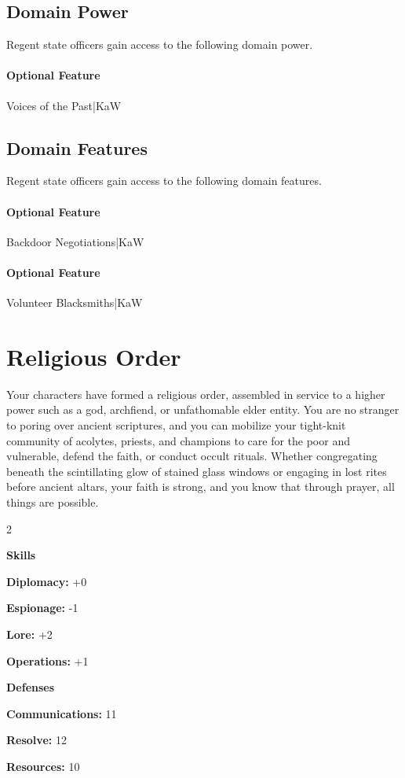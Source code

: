 \documentclass[10pt,a4paper,twoside,bg=print,twocolumn,openany,nodeprecatedcode]{dndbook}
\begin{document}
\subsection{Domain Power}
Regent state officers gain access to the following domain power.

\paragraph{Optional Feature}
Voices of the Past|KaW

\subsection{Domain Features}
Regent state officers gain access to the following domain features.

\paragraph{Optional Feature}
Backdoor Negotiations|KaW

\paragraph{Optional Feature}
Volunteer Blacksmiths|KaW

\section{Religious Order}
Your characters have formed a religious order, assembled in service to a higher power such as a god, archfiend, or unfathomable elder entity. You are no stranger to poring over ancient scriptures, and you can mobilize your tight-knit community of acolytes, priests, and champions to care for the poor and vulnerable, defend the faith, or conduct occult rituals. Whether congregating beneath the scintillating glow of stained glass windows or engaging in lost rites before ancient altars, your faith is strong, and you know that through prayer, all things are possible.


\begin{itemize}
\begin{multicols}{2}
\item \textbf{Skills}
\item \textbf{Diplomacy:} +0
\item \textbf{Espionage:} -1
\item \textbf{Lore:} +2
\item \textbf{Operations:} +1
\item \textbf{Defenses}
\item \textbf{Communications:} 11
\item \textbf{Resolve:} 12
\item \textbf{Resources:} 10
\end{multicols}

\end{itemize}
\end{document}
